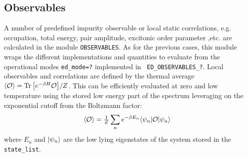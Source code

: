 \documentclass[edipack2.tex]{subfiles}
\begin{document}
\subsection{Observables}\label{sSecObc}
A number of predefined impurity observable or local static
correlations, e.g. occupation, total energy, pair amplitude, excitonic
order parameter ,etc.   are calculated in the module
\texttt{OBSERVABLES}. As for the previous cases, this module wraps the
different implementations and quantities to evaluate from the
operational modes {\tt ed\_mode=?} implemented in {\tt
  ED\_OBSERVABLES\_?}. 
Local observables and correlations are defined by the thermal average  $\langle {\cal O}\rangle =
{\rm Tr}\,{\left[e^{-\beta H}{\cal O}\right]}/Z$. This can be efficiently evaluated at zero and
low temperature using the stored low energy part of the spectrum
leveraging on the exponential cutoff from the Boltzmann factor:
$$
\langle {\cal O}\rangle  = \tfrac{1}{Z}\sum_n e^{-\beta
  E_n}\langle \psi_n|{\cal O}|\psi_n\rangle
$$
where $E_n$ and $|\psi_n\rangle$ are the low lying eigenstates of the
system stored in the {\tt state\_list}. 


\end{document}
